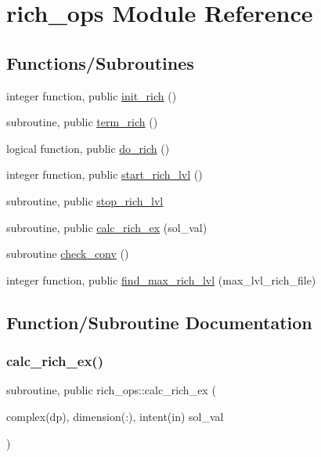 \hypertarget{namespacerich__ops}{}\section{rich\+\_\+ops Module Reference}
\label{namespacerich__ops}
\subsection*{Functions/\+Subroutines}
\begin{DoxyCompactItemize}
\item 
integer function, public \hyperlink{namespacerich__ops_a9fbbda93eab8973d33063e277c489e7b}{init\+\_\+rich} ()
\item 
subroutine, public \hyperlink{namespacerich__ops_a3cf72a3ed0806ac9ddff262a00b2e33d}{term\+\_\+rich} ()
\item 
logical function, public \hyperlink{namespacerich__ops_a50f4088b9ddd59597987fb4112f2a73e}{do\+\_\+rich} ()
\item 
integer function, public \hyperlink{namespacerich__ops_a97206a15127960366fcb41d6889cb3b5}{start\+\_\+rich\+\_\+lvl} ()
\item 
subroutine, public \hyperlink{namespacerich__ops_a56eae87ecc82010895d63b45a16e6106}{stop\+\_\+rich\+\_\+lvl}
\item 
subroutine, public \hyperlink{namespacerich__ops_ad2717df0206a397d0d7845a96aa5da23}{calc\+\_\+rich\+\_\+ex} (sol\+\_\+val)
\item 
subroutine \hyperlink{namespacerich__ops_ac00cce686d45540b238b3b6e39c9bdeb}{check\+\_\+conv} ()
\item 
integer function, public \hyperlink{namespacerich__ops_acadb2170408937a71a230e655bd15675}{find\+\_\+max\+\_\+rich\+\_\+lvl} (max\+\_\+lvl\+\_\+rich\+\_\+file)
\end{DoxyCompactItemize}


\subsection{Function/\+Subroutine Documentation}
\mbox{\label{namespacerich__ops_ad2717df0206a397d0d7845a96aa5da23}} 
\subsubsection{\texorpdfstring{calc\+\_\+rich\+\_\+ex()}{calc\_rich\_ex()}}
{\footnotesize\ttfamily subroutine, public rich\+\_\+ops\+::calc\+\_\+rich\+\_\+ex (\begin{DoxyParamCaption}\item[{complex(dp), dimension(\+:), intent(in)}]{sol\+\_\+val }\end{DoxyParamCaption})}



